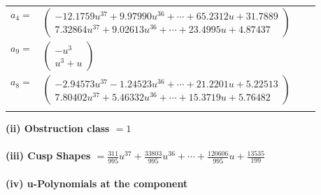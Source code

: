 \documentclass[1p]{elsarticle_modified}
\theoremstyle{definition}
\begin{document}
\begin{tabular}{m{7pt} m{180pt} m{7pt} m{180pt} }
\flushright $a_{4}=$&$\begin{pmatrix}-12.1759 u^{37}+9.97990 u^{36}+\cdots+65.2312 u+31.7889\\7.32864 u^{37}+9.02613 u^{36}+\cdots+23.4995 u+4.87437\end{pmatrix}$ \\
\flushright $a_{9}=$&$\begin{pmatrix}- u^3\\u^3+u\end{pmatrix}$ \\
\flushright $a_{8}=$&$\begin{pmatrix}-2.94573 u^{37}-1.24523 u^{36}+\cdots+21.2201 u+5.22513\\7.80402 u^{37}+5.46332 u^{36}+\cdots+15.3719 u+5.76482\end{pmatrix}$\\&\end{tabular}
\flushleft \textbf{(ii) Obstruction class $= 1$}\\~\\
\flushleft \textbf{(iii) Cusp Shapes $= \frac{311}{995} u^{37}+\frac{33803}{995} u^{36}+\cdots+\frac{120606}{995} u+\frac{13535}{199}$}\\~\\
\newpage\renewcommand{\arraystretch}{1}
\flushleft \textbf{(iv) u-Polynomials at the component}\newline \\
\end{document}
